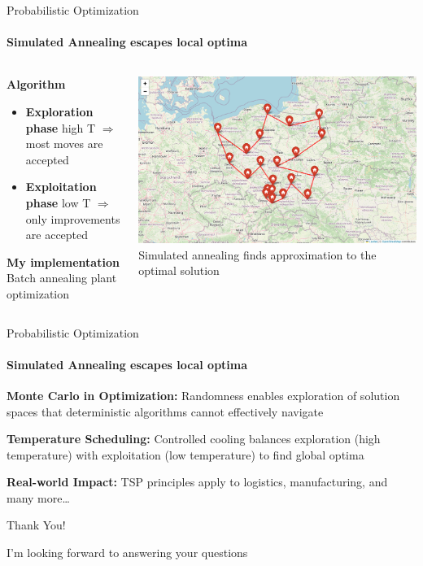 \documentclass{beamer}
\begin{document}
\begin{frame}{Probabilistic Optimization}
  \framesubtitle{Simulated Annealing escapes local optima}
  \begin{columns}[c]
    \begin{column}{0.4\textwidth}
      \textbf{Algorithm}
      \begin{itemize}
        \item \textbf{Exploration phase} high T $\Rightarrow$ most moves are accepted
        \item \textbf{Exploitation phase} low T $\Rightarrow$ only improvements are accepted
      \end{itemize}

      \textbf{My implementation}
      Batch annealing plant optimization
    \end{column}
    \begin{column}{0.6\textwidth}
      \begin{center}
        \includegraphics[width=\textwidth]{images/tsp-annealing.png}
        \\[0.2cm]
        \small{Simulated annealing finds approximation to the optimal solution}
      \end{center}
    \end{column}
  \end{columns}
\end{frame}

\begin{frame}{Probabilistic Optimization}
  \framesubtitle{Simulated Annealing escapes local optima}

  \textbf{Monte Carlo in Optimization:} Randomness enables exploration of solution
  spaces that deterministic algorithms cannot effectively navigate

  \vspace{0.5cm}

  \textbf{Temperature Scheduling:} Controlled cooling balances exploration
  (high temperature) with exploitation (low temperature) to find global optima

  \vspace{0.5cm}

  \textbf{Real-world Impact:} TSP principles apply to logistics, manufacturing,
  and many more\dots

  \vspace{0.5cm}
\end{frame}

\begin{frame}{Thank You!}
  \begin{center}
    \Large{I'm looking forward to answering your questions}
  \end{center}
\end{frame}
\end{document}
